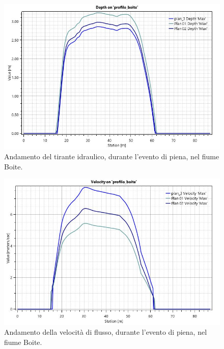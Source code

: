 \begin{figure}[H] \centering
    \includegraphics[scale=0.5]{immagini/depth_boite.JPG}
    \caption{Andamento del tirante idraulico, durante l'evento di piena, nel fiume Boite.}
    \label{figure:depth_boite}
\end{figure}

\begin{figure}[H] \centering
    \includegraphics[scale=0.5]{immagini/velocity_boite.JPG}
    \caption{Andamento della velocità di flusso, durante l'evento di piena, nel fiume Boite.}
    \label{figure:velocity_boite}
\end{figure}

